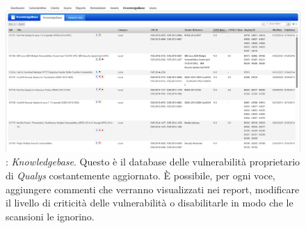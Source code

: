 \documentclass[target=bach,aauheader=]{thud}
\begin{document}
\begin{figure}
\centering
\includegraphics[scale=0.35]{images/qualys_kb.png}
    \caption{: \textit{Knowledgebase}. Questo è il database delle vulnerabilità proprietario di \textit{Qualys} costantemente aggiornato. È possibile, per ogni voce, aggiungere commenti che verranno visualizzati nei report, modificare il livello di criticità delle vulnerabilità o disabilitarle in modo che le scansioni le ignorino.}
\end{figure}


\backmatter





\end{document}
